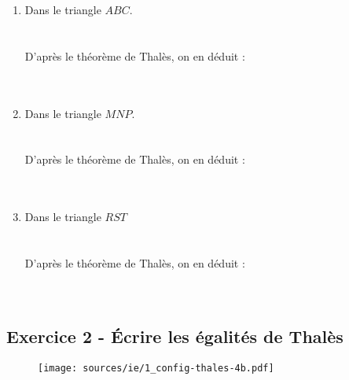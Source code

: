 \documentclass[12pt]{article}
\begin{document}
\begin{multicols}{3}
  \begin{enumerate}
  \item Dans le triangle $ABC$.\\ 
  \phantom{abc}\\
  \phantom{abc}\\
  D'après le théorème de Thalès, on en déduit :\\
   \phantom{abc}\\
  \phantom{abc}\\
  \item Dans le triangle $MNP$.\\ 
  \phantom{abc}\\
  \phantom{abc}\\
  D'après le théorème de Thalès, on en déduit :\\
  \phantom{abc}\\
  \phantom{abc}\\
  \item Dans le triangle $RST$\\
  \phantom{abc}\\
  \phantom{abc}\\
  D'après le théorème de Thalès, on en déduit :\\
  \phantom{abc}\\
  \phantom{abc}\\
  \end{enumerate}
\end{multicols}

\vspace{0.3cm}
\noindent\hrulefill
\vspace{0.3cm}

\subsection*{Exercice 2 - Écrire les égalités de Thalès}

\begin{figure}[H]
  \centering
  \texttt{[image: sources/ie/1\_config-thales-4b.pdf]}
\end{figure}
\end{document}
